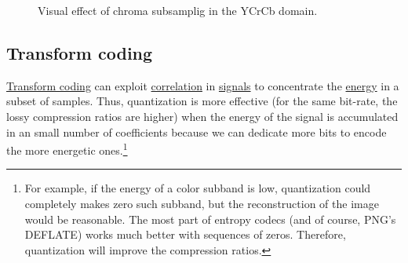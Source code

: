 \begin{figure}
  \centering
  \caption{Visual effect of chroma subsamplig in the YCrCb domain.}
  \label{fig:san-diego_chroma_subsampled}
\end{figure}

\subsection{Transform coding}
\href{https://web.stanford.edu/class/ee398a/handouts/lectures/07-TransformCoding.pdf}{Transform
  coding} can exploit
\href{https://en.wikipedia.org/wiki/Correlation_and_dependence}{correlation}
in \href{https://en.wikipedia.org/wiki/Signal}{signals} to concentrate
the
\href{https://en.wikipedia.org/wiki/Energy_(signal_processing)}{energy}
in a subset of samples. Thus, quantization is more effective (for the same
bit-rate, the lossy compression ratios are higher) when the energy of
the signal is accumulated in an small number of coefficients because
we can dedicate more bits to encode the more energetic
ones.\footnote{For example, if the energy of a color subband is low,
quantization could completely makes zero such subband, but the
reconstruction of the image would be reasonable. The most part of
entropy codecs (and of course, PNG's DEFLATE) works much better with
sequences of zeros. Therefore, quantization will improve the
compression ratios.}


